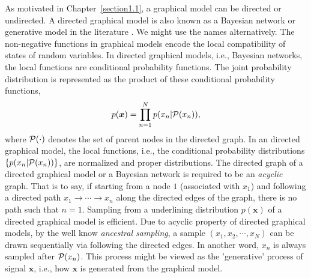 As motivated in Chapter~\ref{section1.1}, a graphical model can be directed or undirected. A directed graphical model is also known as a Bayesian network or generative model in the literature \cite[Chapter~8]{Bishop:2006:PRM:1162264}. We might use the names alternatively. The non-negative functions in graphical models encode the local compatibility of states of random variables. In directed graphical models, i.e., Bayesian networks, the local functions are conditional probability functions. The joint probability distribution is represented as the product of these conditional probability functions,
\begin{equation}
  p(\bm{x}) = \prod_{n=1}^{N}p(x_n| \mathcal{P}(x_n)),
\end{equation}
where $\mathcal{P}(\cdot)$ denotes the set of parent nodes in the directed graph. In an directed graphical model, the local functions, i.e., the conditional probability distributions $\{p(x_n| \mathcal{P}(x_n))\}$, are normalized and proper distributions. The directed graph of a directed graphical model or a Bayesian network is required to be an \textit{acyclic} graph. That is to say, if starting from a node $1$ (associated with $x_1$) and following a directed path $x_1\rightarrow \cdots \rightarrow x_n$ along the directed edges of the graph, there is no path such that $n=1$. Sampling from a underlining distribution $p(\bm{x})$ of a directed graphical model is efficient. Due to acyclic property of directed graphical models, by the well know \textit{ancestral sampling}, a sample $(x_1, x_2, \cdots, x_N)$ can be drawn sequentially via following the directed edges. In another word, $x_n$ is always sampled after $\mathcal{P}(x_n)$. This process might be viewed as the 'generative' process of signal $\bm{x}$, i.e., how $\bm{x}$ is generated from the graphical model.


